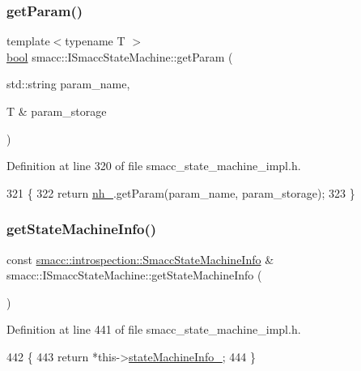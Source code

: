 \subsubsection{\texorpdfstring{get\+Param()}{getParam()}}
{\footnotesize\ttfamily template$<$typename T $>$ \\
\hyperlink{classbool}{bool} smacc\+::\+I\+Smacc\+State\+Machine\+::get\+Param (\begin{DoxyParamCaption}\item[{std\+::string}]{param\+\_\+name,  }\item[{T \&}]{param\+\_\+storage }\end{DoxyParamCaption})\hspace{0.3cm}{\ttfamily [protected]}}



Definition at line 320 of file smacc\+\_\+state\+\_\+machine\+\_\+impl.\+h.


\begin{DoxyCode}
321 \{
322     \textcolor{keywordflow}{return} \hyperlink{classsmacc_1_1ISmaccStateMachine_ad8877bcca9dbb345fe72cca839c93dd3}{nh\_}.getParam(param\_name, param\_storage);
323 \}
\end{DoxyCode}
\mbox{\label{classsmacc_1_1ISmaccStateMachine_a3b1facb0477325fe43b447fc21d9eb7d}} 
\subsubsection{\texorpdfstring{get\+State\+Machine\+Info()}{getStateMachineInfo()}}
{\footnotesize\ttfamily const \hyperlink{classsmacc_1_1introspection_1_1SmaccStateMachineInfo}{smacc\+::introspection\+::\+Smacc\+State\+Machine\+Info} \& smacc\+::\+I\+Smacc\+State\+Machine\+::get\+State\+Machine\+Info (\begin{DoxyParamCaption}{ }\end{DoxyParamCaption})\hspace{0.3cm}{\ttfamily [inline]}}



Definition at line 441 of file smacc\+\_\+state\+\_\+machine\+\_\+impl.\+h.


\begin{DoxyCode}
442 \{
443     \textcolor{keywordflow}{return} *this->\hyperlink{classsmacc_1_1ISmaccStateMachine_a0914aa27c3f51374c338d89a32b135d1}{stateMachineInfo\_};
444 \}
\end{DoxyCode}
\mbox{\label{classsmacc_1_1ISmaccStateMachine_a2d0b1742f17dd77d5df217153e8b5259}} 
